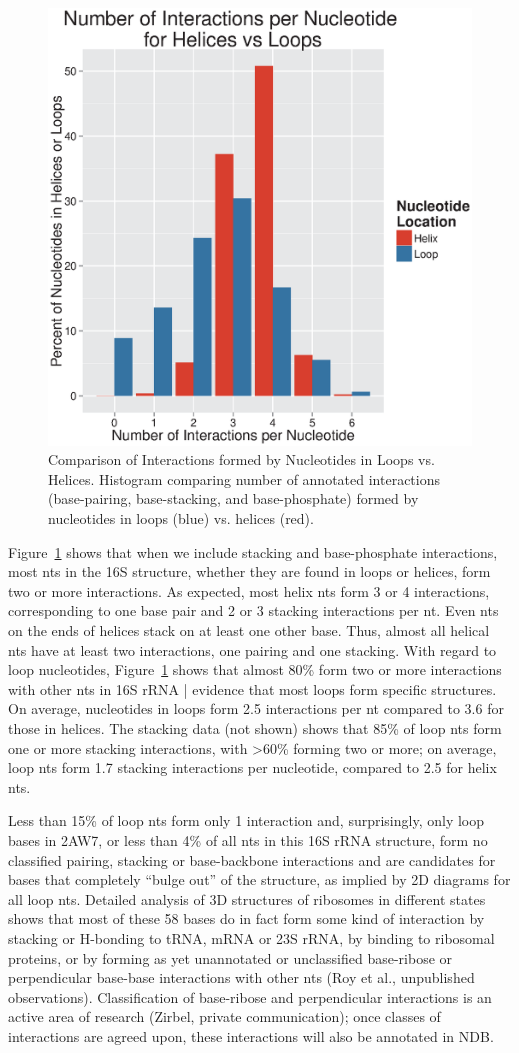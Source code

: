 \begin{figure}
  \includegraphics[width=0.5\linewidth]{chapter-1/figs/inter-loop-v-helix}
  \caption{Comparison of Interactions formed by Nucleotides in Loops vs.
  Helices. Histogram comparing number of annotated interactions (base-pairing,
base-stacking, and base-phosphate) formed by nucleotides in loops (blue) vs.
helices (red).}
  \label{fig:ec-inter-loop-v-helix}
\end{figure}

Figure~\ref{fig:ec-inter-loop-v-helix} shows that when we include stacking and
base-phosphate interactions, most nts in the 16S structure, whether they are
found in loops or helices, form two or more interactions. As expected, most
helix nts form 3 or 4 interactions, corresponding to one base pair and 2 or 3
stacking interactions per nt. Even nts on the ends of helices stack on at least
one other base. Thus, almost all helical nts have at least two interactions, one
pairing and one stacking. With regard to loop nucleotides,
Figure~\ref{fig:ec-inter-loop-v-helix} shows that almost 80\% form two or more
interactions with other nts in 16S rRNA | evidence that most loops form specific
structures. On average, nucleotides in loops form
2.5 interactions per nt compared to 3.6 for those in helices. The stacking data
(not shown) shows that 85\% of loop nts form one or more stacking
interactions, with >60\% forming two or more; on average, loop nts form 1.7
stacking interactions per nucleotide, compared to 2.5 for helix nts. 

Less than 15\% of loop nts form only 1 interaction and, surprisingly, only 
loop bases in 2AW7, or less than 4\% of all nts in this 16S rRNA structure, form
no classified pairing, stacking or base-backbone interactions and are candidates
for bases that completely “bulge out” of the structure, as implied by 2D
diagrams for all loop nts. Detailed analysis of 3D structures of ribosomes in
different states shows that most of these 58 bases do in fact form some kind of
interaction by stacking or H-bonding to tRNA, mRNA or 23S rRNA, by binding to
ribosomal proteins, or by forming as yet unannotated or unclassified base-ribose
or perpendicular base-base interactions with other nts (Roy et al., unpublished
observations). Classification of base-ribose and perpendicular interactions is
an active area of research (Zirbel, private communication); once classes of
interactions are agreed upon, these interactions will also be annotated in NDB. 

